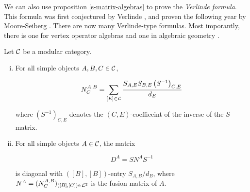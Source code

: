 We can also use proposition \ref{s-matrix-algebras} to prove the {\em Verlinde formula}. This formula was first conjectured by Verlinde \cite{verlinde1988fusion}, and proven the following year by Moore-Seiberg \cite{moore1989classical}. There are now many Verlinde-type formulas. Most imporantly, there is one for vertex operator algebras \cite{huang2008vertex} and one in algebraic geometry \cite{faltings1994proof}.

\begin{thrm}\label{verlinde-formula} Let ${\mathcal C}$ be a modular category.

\begin{enumerate}[(i)]
\item For all simple objects $A,B,C\in {\mathcal C}$,

$$N^{A,B}_C=\sum_{[E]\in {\mathcal L}}\frac{S_{A,E}S_{B,E}\left(S^{-1}\right)_{C,E}}{d_E}$$

where $(S^{-1})_{C,E}$ denotes the $(C,E)$-coefficeint of the inverse of the $S$ matrix.

\item For all simple objects $A\in {\mathcal C}$, the matrix

$$D^A=S N^{A}S^{-1}$$

is diagonal with $([B],[B])$-entry $S_{A,B}/d_B$, where $N^{A}=(N^{A,B}_C)_{([B],[C])\in {\mathcal L}^2}$ is the fusion matrix of $A$.
\end{enumerate}
\end{thrm}
